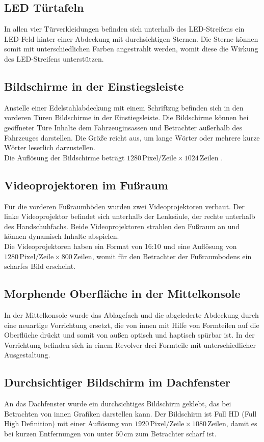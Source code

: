 \subsection{LED Türtafeln}
In allen vier Türverkleidungen befinden sich unterhalb des LED-Streifens ein LED-Feld hinter einer Abdeckung mit durchsichtigen Sternen. Die Sterne können somit mit unterschiedlichen Farben angestrahlt werden, womit diese die Wirkung des LED-Streifens unterstützen. \\
\subsection{Bildschirme in der Einstiegsleiste}
Anstelle einer Edelstahlabdeckung mit einem Schriftzug befinden sich in den vorderen Türen Bildschirme in der Einstiegsleiste. Die Bildschirme können bei geöffneter Türe Inhalte dem Fahrzeuginsassen und Betrachter außerhalb des Fahrzeuges darstellen. Die Größe reicht aus, um lange Wörter oder mehrere kurze Wörter leserlich darzustellen. \\
Die Auflösung der Bildschirme beträgt $ 1280 \,\mathrm{Pixel}/\mathrm{Zeile} \times 1024 \,\mathrm{Zeilen} $ . 
\subsection{Videoprojektoren im Fußraum}
Für die vorderen Fußraumböden wurden zwei Videoprojektoren verbaut. Der linke Videoprojektor befindet sich unterhalb der Lenksäule, der rechte unterhalb des Handschuhfachs. Beide Videoprojektoren strahlen den Fußraum an und können dynamisch Inhalte abspielen. \\
Die Videoprojektoren haben ein Format von 16:10 und eine Auflösung von $ 1280\,\mathrm{Pixel}/\mathrm{Zeile} \times 800\,\mathrm{Zeilen} $, womit für den Betrachter der Fußraumbodens ein scharfes Bild erscheint.
\subsection{Morphende Oberfläche in der Mittelkonsole}
In der Mittelkonsole wurde das Ablagefach und die abgelederte Abdeckung durch eine neuartige Vorrichtung ersetzt, die von innen mit Hilfe von Formteilen auf die Oberflüche drückt und somit von außen optisch und haptisch spürbar ist. In der Vorrichtung befinden sich in einem Revolver drei Formteile mit unterschiedlicher Ausgestaltung.
\subsection{Durchsichtiger Bildschirm im Dachfenster}
An das Dachfenster wurde ein durchsichtiges Bildschirm geklebt, das bei Betrachten von innen Grafiken darstellen kann.
Der Bildschirm ist Full HD (Full High Definition) mit einer Auflösung von $ 1920 \,\mathrm{Pixel}/\mathrm{Zeile} \times 1080 \,\mathrm{Zeilen} $, damit es bei kurzen Entfernungen von unter $ 50\,\mathrm{cm} $ zum Betrachter scharf ist.
